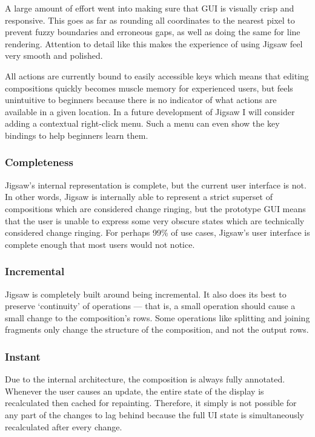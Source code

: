 \documentclass[12pt]{article}
\begin{document}
A large amount of effort went into making sure that GUI is visually crisp and responsive.  This
goes as far as rounding all coordinates to the nearest pixel to prevent fuzzy boundaries and
erroneous gaps, as well as doing the same for line rendering.  Attention to detail like this makes
the experience of using Jigsaw feel very smooth and polished.

All actions are currently bound to easily accessible keys which means that editing compositions
quickly becomes muscle memory for experienced users, but feels unintuitive to beginners because
there is no indicator of what actions are available in a given location.  In a future development of
Jigsaw I will consider adding a contextual right-click menu.  Such a menu can even show the key
bindings to help beginners learn them.

\subsubsection{Completeness}

Jigsaw's internal representation is complete, but the current user interface is not.  In other
words, Jigsaw is internally able to represent a strict superset of compositions which are considered
change ringing, but the prototype GUI means that the user is unable to express some very obscure
states which are technically considered change ringing.  For perhaps 99\% of use cases, Jigsaw's
user interface is complete enough that most users would not notice.

\subsubsection{Incremental}

Jigsaw is completely built around being incremental.  It also does its best to preserve `continuity'
of operations --- that is, a small operation should cause a small change to the composition's rows.
Some operations like splitting and joining fragments only change the structure of the composition,
and not the output rows.

\subsubsection{Instant}

Due to the internal architecture, the composition is always fully annotated.  Whenever the user
causes an update, the entire state of the display is recalculated then cached for repainting.
Therefore, it simply is not possible for any part of the changes to lag behind because the full UI
state is simultaneously recalculated after every change.
\end{document}
